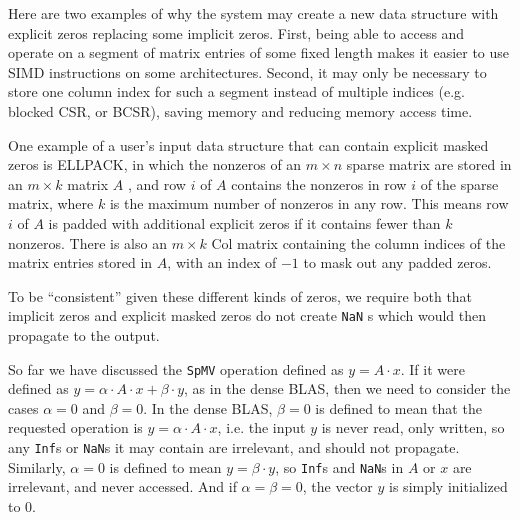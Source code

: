 \documentclass[manuscript,review]{acmart}
\begin{document}
Here are two examples of why the system may create a new data structure with
explicit zeros replacing some implicit zeros. First, being able to access and
operate on a segment of matrix entries of some fixed length makes it easier to
use SIMD instructions on some architectures. Second, it may only be necessary
to store one column index for such a segment instead of multiple indices
(e.g. blocked CSR, or BCSR), saving memory and reducing memory access time.

One example of a user's input data structure that can contain explicit masked zeros is ELLPACK, 
in which the nonzeros of an $m \times n$ sparse matrix are stored in an $m \times k$ matrix $A$ , and row $i$ of $A$
contains the nonzeros in row $i$ of the sparse matrix, where $k$ is the maximum number of 
nonzeros in any row. This means row $i$ of $A$ is padded with additional explicit zeros if it contains
fewer than $k$ nonzeros. There is also an $m \times k$ Col matrix containing the column indices of the
matrix entries stored in $A$, with an index of $-1$ to mask out any padded zeros.

To be ``consistent'' given these different kinds of zeros, we require both that
implicit zeros and explicit masked zeros do not create \texttt{NaN} s which would then
propagate to the output. 

So far we have discussed the \texttt{SpMV} operation defined as $y=A \cdot x$. 
If it were defined as $y = \alpha \cdot A \cdot x + \beta \cdot y$, as in the dense BLAS,
then we need to consider the cases $\alpha = 0$ and $\beta = 0$. In the dense BLAS,
$\beta = 0$ is defined to mean that the requested operation is $y = \alpha \cdot A \cdot x$,
i.e. the input $y$ is never read, only written, so any \texttt{Inf}s or \texttt{NaN}s it may contain are
irrelevant, and should not propagate. Similarly, $\alpha = 0$ is defined to mean
$y = \beta \cdot y$, so \texttt{Inf}s and \texttt{NaN}s in $A$ or $x$ are irrelevant, and never accessed.
And if $\alpha = \beta = 0$, the vector $y$ is simply initialized to 0.
\end{document}
